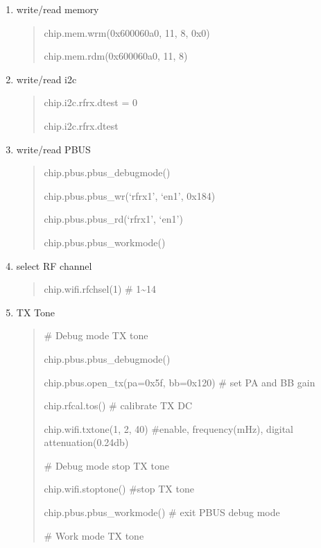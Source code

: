 \documentclass[letterpaper,10pt,english]{sphinxhowto}
\begin{document}
\label{\detokenize{quick_start/quick_start:common-test-commands}}\begin{enumerate}
\def\theenumi{\arabic{enumi}}
\def\labelenumi{\theenumi .}
\makeatletter\def\p@enumii{\p@enumi \theenumi .}\makeatother
\item {} 
write/read memory
\begin{quote}

chip.mem.wrm(0x600060a0, 11, 8, 0x0)

chip.mem.rdm(0x600060a0, 11, 8)
\end{quote}

\item {} 
write/read i2c
\begin{quote}

chip.i2c.rfrx.dtest = 0

chip.i2c.rfrx.dtest
\end{quote}

\item {} 
write/read PBUS
\begin{quote}

chip.pbus.pbus\_debugmode()

chip.pbus.pbus\_wr(‘rfrx1’, ‘en1’, 0x184)

chip.pbus.pbus\_rd(‘rfrx1’, ‘en1’)

chip.pbus.pbus\_workmode()
\end{quote}

\item {} 
select RF channel
\begin{quote}

chip.wifi.rfchsel(1)  \# 1\textasciitilde{}14
\end{quote}

\item {} 
TX Tone
\begin{quote}

\# Debug mode TX tone

chip.pbus.pbus\_debugmode()

chip.pbus.open\_tx(pa=0x5f, bb=0x120)  \# set PA and BB gain

chip.rfcal.tos()    \# calibrate TX DC

chip.wifi.txtone(1, 2, 40)   \#enable, frequency(mHz), digital attenuation(0.24db)

\# Debug mode stop TX tone

chip.wifi.stoptone()   \#stop TX tone

chip.pbus.pbus\_workmode()  \# exit PBUS debug mode

\# Work mode TX tone


\end{quote}
\end{enumerate}
\end{document}
